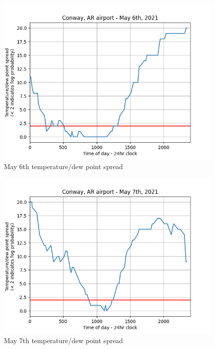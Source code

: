 \documentclass{article}
\begin{document}
\begin{figure}[h]
\begin{center}
\includegraphics[width=1\textwidth]{May6th.png}
\end{center}
\caption{May 6th temperature/dew point spread}
\label{May 6th}
\end{figure}

\begin{figure}[h]
\begin{center}
\includegraphics[width=1\textwidth]{May7th.png}
\end{center}
\caption{May 7th temperature/dew point spread}
\label{May 7th}
\end{figure}
\end{document}
